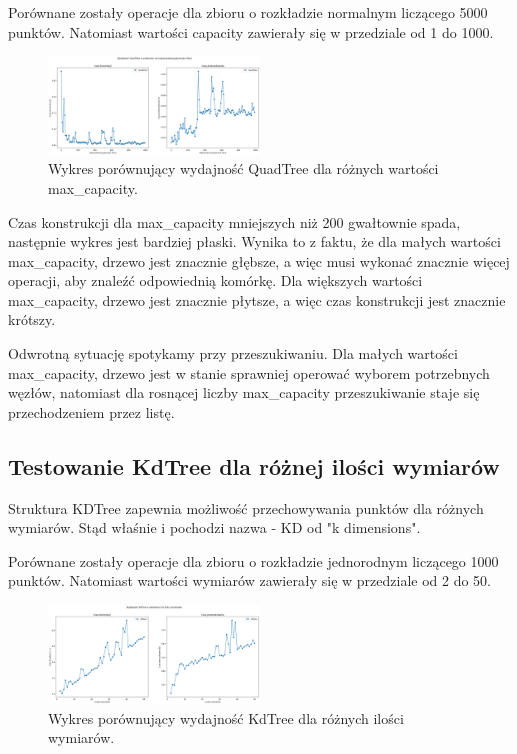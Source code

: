 \documentclass{lab}
\begin{document}
Porównane zostały operacje dla zbioru o rozkładzie normalnym liczącego 5000 punktów.
Natomiast wartości capacity zawierały się w przedziale od 1 do 1000.

\begin{figure}[H]
  \centering
  \includegraphics[width=0.5\textwidth]{resources/capacity_graph.png}
  \caption{Wykres porównujący wydajność QuadTree dla różnych wartości max\_capacity.}
  \label{fig:capacity_graph}
\end{figure}

Czas konstrukcji dla max\_capacity mniejszych niż 200 gwałtownie spada, następnie wykres jest bardziej płaski. Wynika to z faktu, że dla małych wartości max\_capacity, drzewo jest znacznie głębsze, a więc musi wykonać znacznie więcej operacji, aby znaleźć odpowiednią komórkę. Dla większych wartości max\_capacity, drzewo jest znacznie płytsze, a więc czas konstrukcji jest znacznie krótszy.

Odwrotną sytuację spotykamy przy przeszukiwaniu. Dla małych wartości max\_capacity, drzewo jest w stanie sprawniej operować wyborem potrzebnych węzłów, natomiast dla rosnącej liczby max\_capacity przeszukiwanie staje się przechodzeniem przez listę.

\subsection{Testowanie KdTree dla różnej ilości wymiarów}
Struktura KDTree zapewnia możliwość przechowywania punktów dla różnych wymiarów.
Stąd właśnie i pochodzi nazwa - KD od "k dimensions".

Porównane zostały operacje dla zbioru o rozkładzie jednorodnym liczącego 1000 punktów.
Natomiast wartości wymiarów zawierały się w przedziale od 2 do 50.

\begin{figure}[H]
  \centering
  \includegraphics[width=0.5\textwidth]{resources/dimensions_graph.png}
  \caption{Wykres porównujący wydajność KdTree dla różnych ilości wymiarów.}
  \label{fig:dimensions_graph}
\end{figure}
\end{document}
